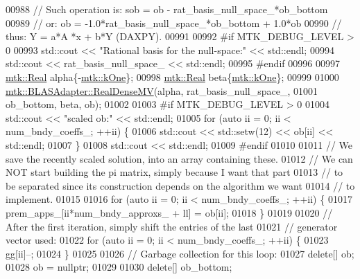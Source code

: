 \begin{DoxyCode}
{{00988     \textcolor{comment}{// Such operation is: sob = ob - rat\_basis\_null\_space\_*ob\_bottom}
00989     \textcolor{comment}{// or:                 ob = -1.0*rat\_basis\_null\_space\_*ob\_bottom + 1.0*ob}
00990     \textcolor{comment}{// thus:                Y =    a*A    *x         +   b*Y (DAXPY).}
00991 
00992 \textcolor{preprocessor}{    #if MTK\_DEBUG\_LEVEL > 0}
00993     std::cout << \textcolor{stringliteral}{"Rational basis for the null-space:"} << std::endl;
00994     std::cout << rat\_basis\_null\_space\_ << std::endl;
00995 \textcolor{preprocessor}{    #endif}
00996 
00997     \hyperlink{group__c01-roots_gac080bbbf5cbb5502c9f00405f894857d}{mtk::Real} alpha\{-\hyperlink{group__c01-roots_ga26407c24d43b6b95480943340d285c71}{mtk::kOne}\};
00998     \hyperlink{group__c01-roots_gac080bbbf5cbb5502c9f00405f894857d}{mtk::Real} beta\{\hyperlink{group__c01-roots_ga26407c24d43b6b95480943340d285c71}{mtk::kOne}\};
00999 
01000     \hyperlink{classmtk_1_1BLASAdapter_afdcac059a4294287cb55638221220646}{mtk::BLASAdapter::RealDenseMV}(alpha, rat\_basis\_null\_space\_,
01001                                   ob\_bottom, beta, ob);
01002 
01003 \textcolor{preprocessor}{    #if MTK\_DEBUG\_LEVEL > 0}
01004     std::cout << \textcolor{stringliteral}{"scaled ob:"} << std::endl;
01005     \textcolor{keywordflow}{for} (\textcolor{keyword}{auto} ii = 0; ii < num\_bndy\_coeffs\_; ++ii) \{
01006       std::cout << std::setw(12) << ob[ii] << std::endl;
01007     \}
01008     std::cout << std::endl;
01009 \textcolor{preprocessor}{    #endif}
01010 
01011     \textcolor{comment}{// We save the recently scaled solution, into an array containing these.}
01012     \textcolor{comment}{// We can NOT start building the pi matrix, simply because I want that part}
01013     \textcolor{comment}{// to be separated since its construction depends on the algorithm we want}
01014     \textcolor{comment}{// to implement.}
01015 
01016     \textcolor{keywordflow}{for} (\textcolor{keyword}{auto} ii = 0; ii < num\_bndy\_coeffs\_; ++ii) \{
01017       prem\_apps\_[ii*num\_bndy\_approxs\_ + ll] = ob[ii];
01018     \}
01019 
01020     \textcolor{comment}{// After the first iteration, simply shift the entries of the last}
01021     \textcolor{comment}{// generator vector used:}
01022     \textcolor{keywordflow}{for} (\textcolor{keyword}{auto} ii = 0; ii < num\_bndy\_coeffs\_; ++ii) \{
01023       gg[ii]--;
01024     \}
01025 
01026     \textcolor{comment}{// Garbage collection for this loop:}
01027     \textcolor{keyword}{delete}[] ob;
01028     ob = \textcolor{keyword}{nullptr};
01029 
01030     \textcolor{keyword}{delete}[] ob\_bottom;
}}
\end{DoxyCode}
